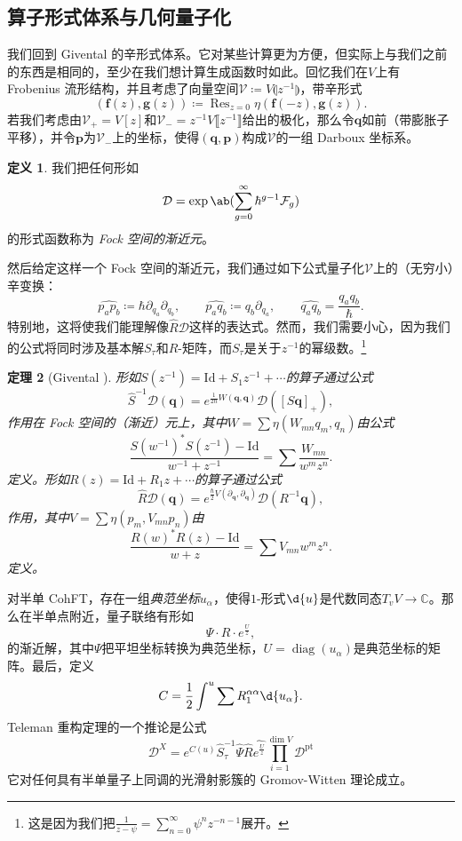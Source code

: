 \documentclass{amsart}
\newtheorem{thm}{定理}[section]
\theoremstyle{definition}
\newtheorem{defn}[thm]{定义}
\theoremstyle{remark}
\theoremstyle{plain}
\theoremstyle{definition}
\theoremstyle{remark}
\newcommand{\C}{\mathbb{C}}
\newcommand{\mc}[1]{\mathcal{#1}}
\newcommand{\mbf}[1]{\mathbf{#1}}
\newcommand{\bq}{\mbf{q}}
\newcommand{\bp}{\mbf{p}}
\newcommand{\mr}[1]{\mathrm{#1}}
\newcommand{\on}[1]{\operatorname{#1}}
\newcommand{\wh}[1]{\widehat{#1}}
\newcommand{\1}{\mathbf{1}}
\newcommand{\2}{\mathbf{2}}
\newcommand{\3}{\mathbf{3}}
\newcommand{\ps}[1]{\llbracket #1 \rrbracket}
\newcommand{\ls}[1]{\llparenthesis #1 \rrparenthesis}
\begin{document}
\subsection{算子形式体系与几何量子化}%
\label{sub:Operator formalism and geometric quantization}

我们回到 Givental 的辛形式体系。它对某些计算更为方便，但实际上与我们之前的东西是相同的，至少在我们想计算生成函数时如此。回忆我们在$V$上有 Frobenius 流形结构，并且考虑了向量空间$\mc{V}\coloneqq V\ls{z^{-1}}$，带辛形式
\[ (\mbf{f}(z), \mbf{g}(z)) \coloneqq \on{Res}_{z=0} \eta(\mbf{f}(-z), \mbf{g}(z)). \]
若我们考虑由$\mc{V}_+ = V[z]$和$\mc{V}_- = z^{-1}V\ps{z^{-1}}$给出的极化，那么令$\bq$如前（带膨胀子平移），并令$\bp$为$\mc{V}_-$上的坐标，使得$(\bq, \bp)$构成$\mc{V}$的一组 Darboux 坐标系。

\begin{defn}
    我们把任何形如
    \[ \mc{D} = \exp\ab(\sum_{g=0}^{\infty} \hbar^{g-1} \mc{F}_g) \]
    的形式函数称为 \textit{Fock 空间的渐近元}。
\end{defn}

然后给定这样一个 Fock 空间的渐近元，我们通过如下公式量子化$\mc{V}$上的（无穷小）辛变换：
\[ \wh{p_a p_b} \coloneqq \hbar \partial_{q_a} \partial_{q_b}, \qquad \wh{p_a q_b} \coloneqq q_b \partial_{q_a}, \qquad \wh{q_a q_b} = \frac{q_a q_b}{\hbar}. \]
特别地，这将使我们能理解像$\hat{R} \mc{D}$这样的表达式。然而，我们需要小心，因为我们的公式将同时涉及基本解$S_{\tau}$和$R$-矩阵，而$S_{\tau}$是关于$z^{-1}$的幂级数。\footnote{这是因为我们把$\frac{1}{z-\psi} = \sum_{n=0}^{\infty} \psi^n z^{-n-1}$展开。}

\begin{thm}[Givental {\cite{Givental2001quantization}}]
    形如$S(z^{-1}) = \mr{Id} + S_1 z^{-1} + \cdots$的算子通过公式
    \[ \hat{S}^{-1} \mc{D}(\bq) = e^{\frac{1}{2\hbar}W(\bq,\bq)} \mc{D}([S \bq]_+), \]
    作用在 Fock 空间的（渐近）元上，其中$W = \sum \eta(W_{mn}q_m, q_n)$由公式
    \[ \frac{S(w^{-1})^* S(z^{-1}) - \mr{Id}}{w^{-1}+z^{-1}} = \sum \frac{W_{mn}}{w^m z^n}. \]
    定义。形如$R(z) = \mr{Id} + R_1 z + \cdots$的算子通过公式
    \[ \hat{R}\mc{D}(\bq) = e^{\frac{\hbar}{2} V(\partial_{\bq}, \partial_{\bq})} \mc{D}(R^{-1} \bq), \]
    作用，其中$V = \sum \eta(p_m, V_{mn} p_n)$由
    \[ \frac{R(w)^* R(z) - \mr{Id}}{w+z} = \sum V_{mn} w^m z^n. \]
    定义。
\end{thm}

对半单 CohFT，存在一组\textit{典范坐标}$u_{\alpha}$，使得$1$-形式$\d{u}$是代数同态$T_v V \to \C$。那么在半单点附近，量子联络有形如
\[ \Psi \cdot  R \cdot e^{\frac{U}{z}}, \]
的渐近解，其中$\Psi$把平坦坐标转换为典范坐标，$U = \on{diag}(u_{\alpha})$是典范坐标的矩阵。最后，定义
\[ C = \frac{1}{2} \int^u \sum R_1^{\alpha\alpha} \d{u_{\alpha}}. \]
Teleman 重构定理的一个推论是公式
\[ \mc{D}^X = e^{C(u)} \hat{S}^{-1}_{\tau} \hat{\Psi} \hat{R} \wh{e^{\frac{U}{z}}} \prod_{i=1}^{\dim V} \mc{D}^{\mr{pt}} \]
它对任何具有半单量子上同调的光滑射影簇的 Gromov-Witten 理论成立。
\end{document}
